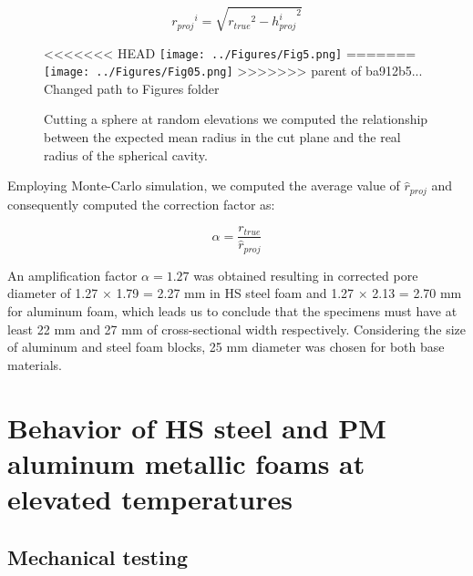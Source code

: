 \documentclass[review]{elsarticle}
\begin{document}
\begin{equation}\label{Eq11}
{r_{proj}}^i=\sqrt{{r_{true}}^2-{h_{proj}^i}^2}
\end{equation}


\begin{figure}[htbp]
	\begin{center}
<<<<<<< HEAD
		\texttt{[image: ../Figures/Fig5.png]}
=======
		\texttt{[image: ../Figures/Fig05.png]}
>>>>>>> parent of ba912b5... Changed path to Figures folder
		\caption{Cutting a sphere at random elevations we computed the relationship between the expected mean radius in the cut plane and the real radius of the spherical cavity.}
		\label{RandomPlaneCut}
	\end{center}
\end{figure}

Employing Monte-Carlo simulation, we computed the average value of $\hat{r}_{proj}$  and consequently computed the correction factor as:

\begin{equation}\label{Eq12}
\alpha=\frac{r_{true}}{\hat{r}_{proj}}
\end{equation}


An amplification factor $\alpha=1.27$ was obtained resulting in corrected pore diameter of 1.27 $\times$ 1.79 = 2.27 mm in HS steel foam and 1.27 $\times$ 2.13 = 2.70 mm for aluminum foam, which leads us to conclude that the specimens must have at least 22 mm and 27 mm of cross-sectional width respectively. Considering the size of aluminum and steel foam blocks, 25 mm diameter was chosen for both base materials.


\section{Behavior of HS steel and PM aluminum metallic foams at elevated temperatures}

\subsection*{Mechanical testing}
\end{document}

